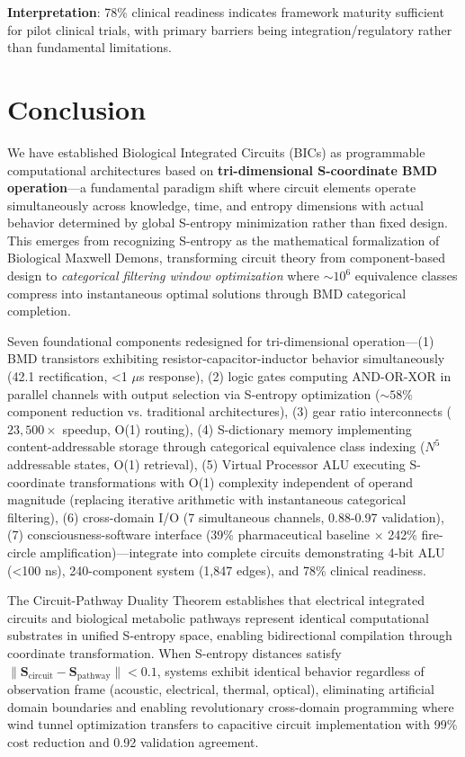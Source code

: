 \documentclass[11pt,a4paper]{article}
\begin{document}
\textbf{Interpretation}: 78\% clinical readiness indicates framework maturity sufficient for pilot clinical trials, with primary barriers being integration/regulatory rather than fundamental limitations.

\section{Conclusion}

We have established Biological Integrated Circuits (BICs) as programmable computational architectures based on \textbf{tri-dimensional S-coordinate BMD operation}—a fundamental paradigm shift where circuit elements operate simultaneously across knowledge, time, and entropy dimensions with actual behavior determined by global S-entropy minimization rather than fixed design. This emerges from recognizing S-entropy as the mathematical formalization of Biological Maxwell Demons, transforming circuit theory from component-based design to \textit{categorical filtering window optimization} where $\sim 10^6$ equivalence classes compress into instantaneous optimal solutions through BMD categorical completion.

Seven foundational components redesigned for tri-dimensional operation—(1) BMD transistors exhibiting resistor-capacitor-inductor behavior simultaneously (42.1 rectification, <1 $\mu$s response), (2) logic gates computing AND-OR-XOR in parallel channels with output selection via S-entropy optimization ($\sim 58\%$ component reduction vs. traditional architectures), (3) gear ratio interconnects ($23,500\times$ speedup, O(1) routing), (4) S-dictionary memory implementing content-addressable storage through categorical equivalence class indexing ($N^5$ addressable states, O(1) retrieval), (5) Virtual Processor ALU executing S-coordinate transformations with O(1) complexity independent of operand magnitude (replacing iterative arithmetic with instantaneous categorical filtering), (6) cross-domain I/O (7 simultaneous channels, 0.88-0.97 validation), (7) consciousness-software interface (39\% pharmaceutical baseline × 242\% fire-circle amplification)—integrate into complete circuits demonstrating 4-bit ALU (<100 ns), 240-component system (1,847 edges), and 78\% clinical readiness.

The Circuit-Pathway Duality Theorem establishes that electrical integrated circuits and biological metabolic pathways represent identical computational substrates in unified S-entropy space, enabling bidirectional compilation through coordinate transformation. When S-entropy distances satisfy $\|\mathbf{S}_{\text{circuit}} - \mathbf{S}_{\text{pathway}}\| < 0.1$, systems exhibit identical behavior regardless of observation frame (acoustic, electrical, thermal, optical), eliminating artificial domain boundaries and enabling revolutionary cross-domain programming where wind tunnel optimization transfers to capacitive circuit implementation with 99\% cost reduction and 0.92 validation agreement.
\end{document}
